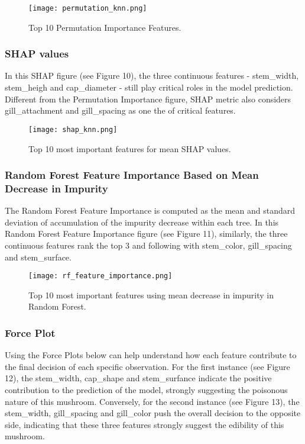 \documentclass{article}
\begin{document}
\begin{figure}[h]
\centering
\texttt{[image: permutation\_knn.png]}
\caption{\label{fig:frog} Top 10 Permutation Importance Features.}
\end{figure}

\subsubsection{SHAP values}
\hspace{0.5cm} In this SHAP figure (see Figure 10), the three continuous features - stem\_width, stem\_heigh and cap\_diameter - still play critical roles in the model prediction. Different from the Permutation Importance figure, SHAP metric also considers gill\_attachment and gill\_spacing as one the of critical features.

\begin{figure}[h]
\centering
\texttt{[image: shap\_knn.png]}
\caption{\label{fig:frog} Top 10 most important features for mean SHAP values.}
\end{figure}

\subsubsection{Random Forest Feature Importance Based on Mean Decrease in Impurity}
\hspace{0.5cm} The Random Forest Feature Importance is computed as the mean and standard deviation of accumulation of the impurity decrease within each tree. In this Random Forest Feature Importance figure (see Figure 11), similarly, the three continuous features rank the top 3 and following with stem\_color, gill\_spacing and stem\_surface. 

\begin{figure}[h]
\centering
\texttt{[image: rf\_feature\_importance.png]}
\caption{\label{fig:frog} Top 10 most important features using mean decrease in impurity in Random Forest.}
\end{figure}

\subsubsection{Force Plot}
\hspace{0.5cm} Using the Force Plots below can help understand how each feature contribute to the final decision of each specific observation. For the first instance (see Figure 12), the stem\_width, cap\_shape and stem\_surfance indicate the positive contribution to the prediction of the model, strongly suggesting the poisonous nature of this mushroom. Conversely, for the second instance (see Figure 13), the stem\_width, gill\_spacing and gill\_color push the overall decision to the opposite side, indicating that these three features strongly suggest the edibility of this mushroom.
\end{document}
